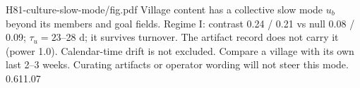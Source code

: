{H81-culture-slow-mode/fig.pdf}
{Village content has a collective slow mode $u_b$ beyond its members and goal fields.}
{Regime I: contrast 0.24 / 0.21 vs null 0.08 / 0.09; $\tau_u=23$--28 d; it survives turnover. The artifact record does not carry it (power 1.0). Calendar-time drift is not excluded.}
{Compare a village with its own last 2--3 weeks. Curating artifacts or operator wording will not steer this mode.}
{0.61}{1.07}
